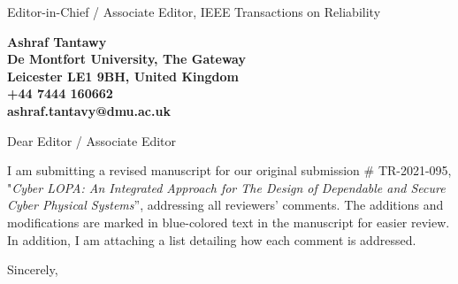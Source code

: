 \documentclass[11pt]{letter} %
\begin{document}
\signature{Ashraf Tantawy \\ Senior Lecturer \\
School of Computer Science and Informatics \\
De Montfort University}              %
\longindentation=0pt                       %
\let\raggedleft\raggedright                %
 
\begin{letter}{%
 Editor-in-Chief / Associate Editor, IEEE Transactions on Reliability
 } 

\begin{center}
\large\bf Ashraf Tantawy \\
De Montfort University, The Gateway \\ Leicester LE1 9BH, United Kingdom \\ +44 7444 160662 \\ ashraf.tantavy@dmu.ac.uk
\end{center} 
\vfill %


 
\opening{Dear Editor / Associate Editor}

\noindent I am submitting a revised manuscript for our original submission \# TR-2021-095, "\emph{Cyber LOPA: An Integrated Approach for The Design of Dependable and Secure Cyber Physical Systems}'', addressing all reviewers' comments. The additions and modifications are marked in blue-colored text  in the manuscript for easier review. In addition, I am attaching a list detailing how each comment is addressed.

\closing{Sincerely,}

 

\end{letter}
 
\end{document}

